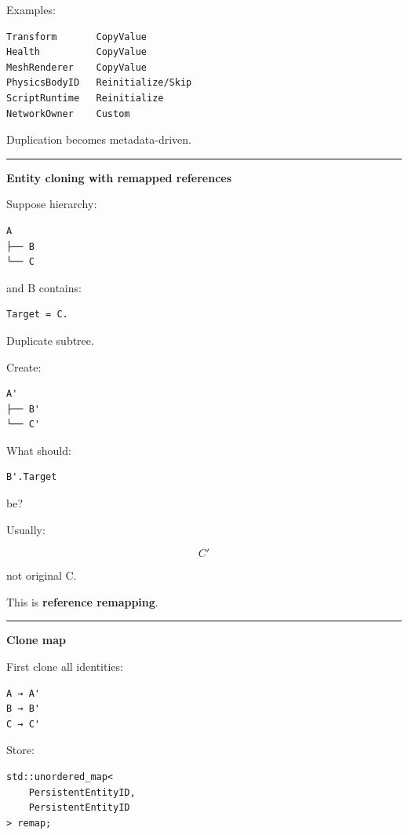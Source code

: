 Examples:

\begin{verbatim}
Transform       CopyValue
Health          CopyValue
MeshRenderer    CopyValue
PhysicsBodyID   Reinitialize/Skip
ScriptRuntime   Reinitialize
NetworkOwner    Custom
\end{verbatim}

Duplication becomes metadata-driven.

\begin{center}\rule{0.5\linewidth}{0.5pt}\end{center}

\textbf{Entity cloning with remapped references}

Suppose hierarchy:

\begin{verbatim}
A
├── B
└── C
\end{verbatim}

and B contains:

\begin{verbatim}
Target = C.
\end{verbatim}

Duplicate subtree.

Create:

\begin{verbatim}
A'
├── B'
└── C'
\end{verbatim}

What should:

\begin{verbatim}
B'.Target
\end{verbatim}

be?

Usually:

\[
C'
\]

not original C.

This is \textbf{reference remapping}.

\begin{center}\rule{0.5\linewidth}{0.5pt}\end{center}

\textbf{Clone map}

First clone all identities:

\begin{verbatim}
A → A'
B → B'
C → C'
\end{verbatim}

Store:

\begin{verbatim}
std::unordered_map<
    PersistentEntityID,
    PersistentEntityID
> remap;
\end{verbatim}


